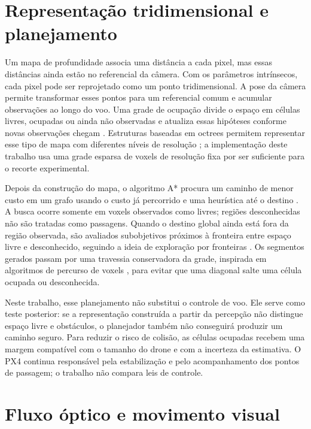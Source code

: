 \section{Representação tridimensional e planejamento}

Um mapa de profundidade associa uma distância a cada pixel, mas essas distâncias ainda estão no referencial da câmera. Com os parâmetros intrínsecos, cada pixel pode ser reprojetado como um ponto tridimensional. A pose da câmera permite transformar esses pontos para um referencial comum e acumular observações ao longo do voo. Uma grade de ocupação divide o espaço em células livres, ocupadas ou ainda não observadas e atualiza essas hipóteses conforme novas observações chegam \cite{Elfes1989}. Estruturas baseadas em octrees permitem representar esse tipo de mapa com diferentes níveis de resolução \cite{Hornung2013}; a implementação deste trabalho usa uma grade esparsa de voxels de resolução fixa por ser suficiente para o recorte experimental.

Depois da construção do mapa, o algoritmo A* procura um caminho de menor custo em um grafo usando o custo já percorrido e uma heurística até o destino \cite{Hart1968}. A busca ocorre somente em voxels observados como livres; regiões desconhecidas não são tratadas como passagens. Quando o destino global ainda está fora da região observada, são avaliados subobjetivos próximos à fronteira entre espaço livre e desconhecido, seguindo a ideia de exploração por fronteiras \cite{Yamauchi1997}. Os segmentos gerados passam por uma travessia conservadora da grade, inspirada em algoritmos de percurso de voxels \cite{AmanatidesWoo1987}, para evitar que uma diagonal salte uma célula ocupada ou desconhecida.

Neste trabalho, esse planejamento não substitui o controle de voo. Ele serve como teste posterior: se a representação construída a partir da percepção não distingue espaço livre e obstáculos, o planejador também não conseguirá produzir um caminho seguro. Para reduzir o risco de colisão, as células ocupadas recebem uma margem compatível com o tamanho do drone e com a incerteza da estimativa. O PX4 continua responsável pela estabilização e pelo acompanhamento dos pontos de passagem; o trabalho não compara leis de controle.

\section{Fluxo óptico e movimento visual}

